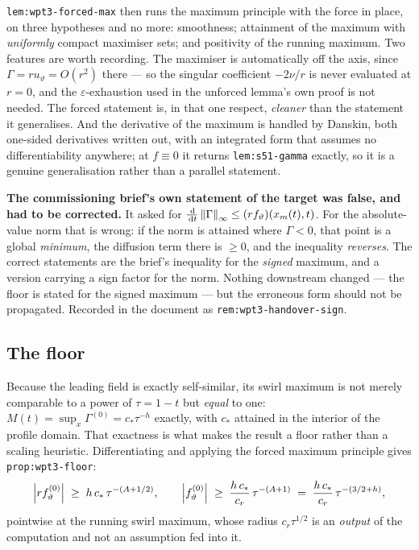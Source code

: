 \texttt{lem:wpt3-forced-max} then runs the maximum principle with the force in
place, on three hypotheses and no more: smoothness; attainment of the maximum
with \emph{uniformly} compact maximiser sets; and positivity of the running
maximum. Two features are worth recording. The maximiser is automatically off
the axis, since \(\Gamma=r u_\vartheta=O(r^2)\) there --- so the singular
coefficient \(-2\nu/r\) is never evaluated at \(r=0\), and the
\(\varepsilon\)-exhaustion used in the unforced lemma's own proof is not needed.
The forced statement is, in that one respect, \emph{cleaner} than the statement
it generalises. And the derivative of the maximum is handled by Danskin, both
one-sided derivatives written out, with an integrated form that assumes no
differentiability anywhere; at \(f\equiv0\) it returns \texttt{lem:s51-gamma}
exactly, so it is a genuine generalisation rather than a parallel statement.

\begin{record}
\textbf{The commissioning brief's own statement of the target was false, and
had to be corrected.} It asked for
\(\tfrac{\,\mathrm{d}}{\,\mathrm{d} t}\left\|\Gamma\right\|_\infty\leq(rf_\vartheta)(x_m(t),t)\). For
the absolute-value norm that is wrong: if the norm is attained where
\(\Gamma<0\), that point is a global \emph{minimum}, the diffusion term there
is \(\geq0\), and the inequality \emph{reverses}. The correct statements are the
brief's inequality for the \emph{signed} maximum, and a version carrying a sign
factor for the norm. Nothing downstream changed --- the floor is stated for the
signed maximum --- but the erroneous form should not be propagated. Recorded in
the document as \texttt{rem:wpt3-handover-sign}.
\end{record}

\subsection{The floor}

Because the leading field is exactly self-similar, its swirl maximum is not
merely comparable to a power of \(\tau=1-t\) but \emph{equal} to one:
\(M(t)=\sup_x\Gamma^{(0)}=c_*\tau^{-h}\) exactly, with \(c_*\) attained in the
interior of the profile domain. That exactness is what makes the result a floor
rather than a scaling heuristic. Differentiating and applying the forced maximum
principle gives \texttt{prop:wpt3-floor}:
\[
  \left|r f_\vartheta^{(0)}\right| \;\geq\; h\,c_*\,\tau^{-(A+1/2)},
  \qquad
  \left|f_\vartheta^{(0)}\right| \;\geq\; \frac{h\,c_*}{c_r}\,\tau^{-(A+1)}
  \;=\;\frac{h\,c_*}{c_r}\,\tau^{-(3/2+h)},
\]
pointwise at the running swirl maximum, whose radius \(c_r\tau^{1/2}\) is an
\emph{output} of the computation and not an assumption fed into it.

